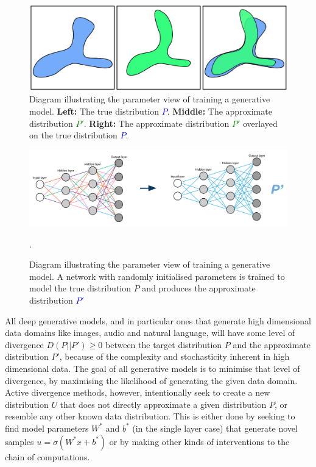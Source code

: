 \begin{figure}[!htbp]
    \centering
    \includegraphics[width=1\textwidth]{figures/c2_background/diagrams/training_gen_model_distro_view.png}
    \caption[Diagram illustrating the distribution view of training a generative model.]{Diagram illustrating the parameter view of training a generative model. \textbf{Left:} The true distribution \textcolor{blue}{$P$}. \textbf{Middle:} The approximate distribution \textcolor{green}{$P'$}. \textbf{Right:} The approximate distribution \textcolor{green}{$P'$} overlayed on the true distribution \textcolor{blue}{$P$}.}
  \label{fig:c6:gen-model-distribution-view}
  \end{figure}

\begin{figure}[!htbp]
    \centering
    \includegraphics[width=1\textwidth]{figures/c2_background/diagrams/training_generative_model_parameter_view.png}
    \caption[Diagram illustrating the parameter view of training a generative model.]{Diagram illustrating the parameter view of training a generative model. A network with randomly initialised parameters is trained to model the true distribution $P$ and produces the approximate distribution \textcolor{blue}{$P'$}}.
  \label{fig:c6:gen-model-parameter-view}
  \end{figure}

All deep generative models, and in particular ones that generate high dimensional data domains like images, audio and natural language, will have some level of divergence $D(P||P') \geq 0$ between the target distribution $P$ and the approximate distribution $P'$, because of the complexity and stochasticity inherent in high dimensional data. 
The goal of all generative models is to minimise that level of divergence, by maximising the likelihood of generating the given data domain. 
Active divergence methods, however, intentionally seek to create a new distribution $U$ that does not directly approximate a given distribution $P$, or resemble any other known data distribution. 
This is either done by seeking to find model parameters $W^*$ and $b^*$ (in the single layer case) that generate novel samples $u = \sigma(W^*x+b^*)$ or by making other kinds of interventions to the chain of computations.

